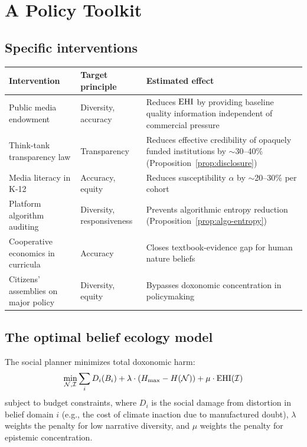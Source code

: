 \section{A Policy Toolkit}
\label{sec:ch33-policy}

\subsection{Specific interventions}

\begin{center}
\begin{tabular}{p{4cm}p{3cm}p{4.5cm}}
\toprule
Intervention & Target principle & Estimated effect \\
\midrule
Public media endowment & Diversity, accuracy & Reduces $\mathrm{EHI}$ by providing baseline quality information independent of commercial pressure \\[4pt]
Think-tank transparency law & Transparency & Reduces effective credibility of opaquely funded institutions by $\sim$30--40\% (Proposition~\ref{prop:disclosure}) \\[4pt]
Media literacy in K-12 & Accuracy, equity & Reduces susceptibility $\alpha$ by $\sim$20--30\% per cohort \\[4pt]
Platform algorithm auditing & Diversity, responsiveness & Prevents algorithmic entropy reduction (Proposition~\ref{prop:algo-entropy}) \\[4pt]
Cooperative economics in curricula & Accuracy & Closes textbook-evidence gap for human nature beliefs \\[4pt]
Citizens' assemblies on major policy & Diversity, equity & Bypasses doxonomic concentration in policymaking \\
\bottomrule
\end{tabular}
\end{center}

\subsection{The optimal belief ecology model}

\begin{model}
\label{mod:optimal-ecology}
The social planner minimizes total doxonomic harm:
\[
  \min_{\mathcal{N}, \mathcal{I}} \sum_i D_i(B_{i}) + \lambda \cdot (H_{\max} - H(\mathcal{N})) + \mu \cdot \mathrm{EHI}(\mathcal{I})
\]
subject to budget constraints, where $D_i$ is the social damage from distortion in belief domain $i$ (e.g., the cost of climate inaction due to manufactured doubt), $\lambda$ weights the penalty for low narrative diversity, and $\mu$ weights the penalty for epistemic concentration.
\end{model}

